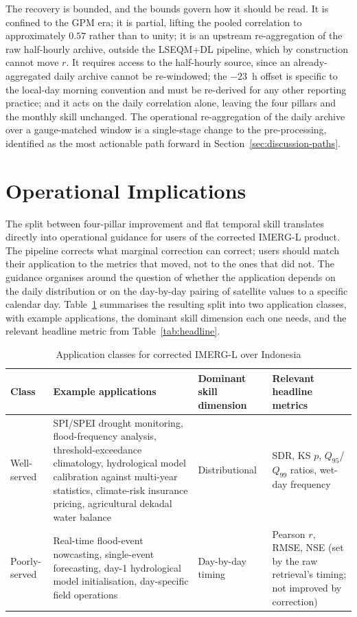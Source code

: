 The recovery is bounded, and the bounds govern how it should be
read. It is confined to the GPM era; it is partial, lifting the
pooled correlation to approximately $0.57$ rather than to unity; it
is an upstream re-aggregation of the raw half-hourly archive,
outside the LSEQM+DL pipeline, which by construction cannot move
$r$. It requires access to the half-hourly source, since an
already-aggregated daily archive cannot be re-windowed; the
$-23$~h offset is specific to the local-day morning convention and
must be re-derived for any other reporting practice; and it acts on
the daily correlation alone, leaving the four pillars and the
monthly skill unchanged. The operational re-aggregation of the
daily archive over a gauge-matched window is a single-stage change
to the pre-processing, identified as the most actionable path
forward in Section~\ref{sec:discussion-paths}.


\section{Operational Implications}\label{sec:discussion-ops}

The split between four-pillar improvement and flat temporal skill
translates directly into operational guidance for users of the
corrected IMERG-L product. The pipeline corrects what marginal
correction can correct; users should match their application to
the metrics that moved, not to the ones that did not. The
guidance organises around the question of whether the application
depends on the daily distribution or on the day-by-day pairing of
satellite values to a specific calendar day.
Table~\ref{tab:app-classes} summarises the resulting split into
two application classes, with example applications, the
dominant skill dimension each one needs, and the
relevant headline metric from Table~\ref{tab:headline}.

\begin{table}[H]
\centering
\caption[Application classes for corrected IMERG-L over Indonesia]{Application classes for corrected IMERG-L over
Indonesia\label{tab:app-classes}}
\begingroup\small
\begin{tabular}{@{}p{2cm}p{5.5cm}p{2.5cm}p{2.5cm}@{}}
\toprule
Class & Example applications & Dominant
skill dimension & Relevant headline metrics \\
\midrule
Well-served &
SPI/SPEI drought monitoring, flood-frequency analysis,
threshold-exceedance climatology, hydrological model calibration
against multi-year statistics, climate-risk insurance pricing,
agricultural dekadal water balance &
Distributional &
SDR, KS $p$, $Q_{95}$/$Q_{99}$ ratios, wet-day frequency \\
\addlinespace
Poorly-served &
Real-time flood-event nowcasting, single-event forecasting,
day-1 hydrological model initialisation, day-specific field
operations &
Day-by-day timing &
Pearson $r$, RMSE, NSE (set by the raw retrieval's timing; not improved by correction) \\
\bottomrule
\end{tabular}
\endgroup
\end{table}

